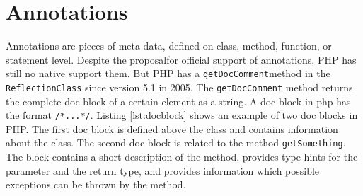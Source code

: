 \documentclass[../main.tex]{subfiles}
\begin{document}
    
    
    \section{Annotations}\label{sec:background_annotations}
    Annotations are pieces of meta data, defined on class, method, function, or statement level.
    Despite the proposal\footnotemark for official support of annotations, PHP has still no native support them.
    But PHP has a \texttt{getDocComment}\footnotemark method in the \texttt{ReflectionClass} since version 5.1 in 2005. 
    The \texttt{getDocComment} method returns the complete doc block of a certain element as a string.
    A doc block in php has the format \texttt{\slash**...*\slash}.
    Listing \ref{lst:docblock} shows an example of two doc blocks in PHP.
    The first doc block is defined above the class and contains information about the class.
    The second doc block is related to the method \texttt{getSomething}. 
    The block contains a short description of the method, provides type hints for the parameter and the return type, and provides information which possible exceptions can be thrown by the method. 
    
    
\end{document}
